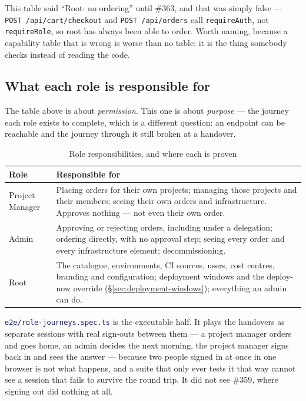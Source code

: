 \documentclass[12pt,a4paper,twoside]{report}
\newcommand{\code}[1]{\texttt{#1}}
\newcommand{\file}[1]{\texttt{\textcolor{MidnightBlue}{#1}}}
\begin{document}
\noindent This table said ``Root: no ordering'' until \#363, and that was
simply false --- \code{POST /api/cart/checkout} and \code{POST /api/orders}
call \code{requireAuth}, not \code{requireRole}, so root has always been able
to order. Worth naming, because a capability table that is wrong is worse than
no table: it is the thing somebody checks instead of reading the code.

\subsection*{What each role is responsible for}
\label{sec:role-responsibilities}

The table above is about \emph{permission}. This one is about \emph{purpose} —
the journey each role exists to complete, which is a different question: an
endpoint can be reachable and the journey through it still broken at a handover.

\begin{table}[H]
  \centering
  \caption{Role responsibilities, and where each is proven}
  \begin{tabularx}{\linewidth}{@{}l>{\raggedright\arraybackslash}X@{}}
    \toprule
    \textbf{Role} & \textbf{Responsible for} \\
    \midrule
    Project Manager & Placing orders for their own projects; managing those
      projects and their members; seeing their own orders and infrastructure.
      Approves nothing --- not even their own order. \\
    Admin & Approving or rejecting orders, including under a delegation;
      ordering directly, with no approval step; seeing every order and every
      infrastructure element; decommissioning. \\
    Root & The catalogue, environments, CI sources, users, cost centres,
      branding and configuration; deployment windows and the deploy-now
      override (\S\ref{sec:deployment-windows}); everything an admin can do. \\
    \bottomrule
  \end{tabularx}
\end{table}

\noindent \file{e2e/role-journeys.spec.ts} is the executable half. It plays the
handovers as separate sessions with real sign-outs between them --- a project
manager orders and goes home, an admin decides the next morning, the project
manager signs back in and sees the answer --- because two people signed in at
once in one browser is not what happens, and a suite that only ever tests it
that way cannot see a session that fails to survive the round trip. It did not
see \#359, where signing out did nothing at all.
\end{document}
